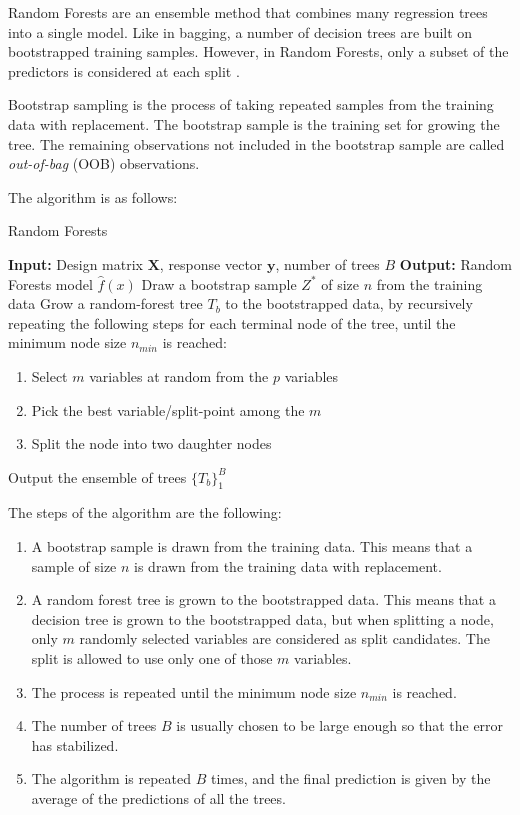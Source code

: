 \documentclass[12 pt]{scrartcl}
\numberwithin{equation}{section}
\begin{document}
Random Forests are an ensemble method that combines many regression trees into a single model.
Like in bagging, a number of decision trees are built on bootstrapped training samples.
However, in Random Forests, only a subset of the predictors is considered at each split
\citep[p.385-386]{stat-learning}.

Bootstrap sampling is the process of taking repeated samples from the training data with replacement.
The bootstrap sample is the training set for growing the tree.
The remaining observations not included in the bootstrap sample are called \textit{out-of-bag} (OOB) observations.

The algorithm is as follows:

\begin{algorithm}[H]
    \caption{Random Forests}\label{alg:cap}
    \begin{algorithmic}
    \State \textbf{Input:} Design matrix $\mathbf{X}$, response vector $\mathbf{y}$, number of trees $B$
    \State \textbf{Output:} Random Forests model $\hat{f}(x)$
    \State Draw a bootstrap sample $Z^{*}$ of size $n$ from the training data
    \State Grow a random-forest tree $T_{b}$ to the bootstrapped data, by recursively repeating the following steps for each terminal node of the tree, until the minimum node size $n_{min}$ is reached:
    \begin{enumerate}
        \item Select $m$ variables at random from the $p$ variables
        \item Pick the best variable/split-point among the $m$
        \item Split the node into two daughter nodes
    \end{enumerate}
    \EndFor
    \State Output the ensemble of trees $\{T_{b}\}_{1}^{B}$
    \end{algorithmic}
    \end{algorithm}

The steps of the algorithm are the following:

\begin{enumerate}
    \item A bootstrap sample is drawn from the training data. This means that a sample of size $n$ is drawn from the training data with replacement.
    \item A random forest tree is grown to the bootstrapped data. This means that a decision tree is grown to the bootstrapped data, but when splitting a node, only $m$ randomly selected variables are considered as split candidates. The split is allowed to use only one of those $m$ variables.
    \item The process is repeated until the minimum node size $n_{min}$ is reached.
    \item The number of trees $B$ is usually chosen to be large enough so that the error has stabilized.
    \item The algorithm is repeated $B$ times, and the final prediction is given by the average of the predictions of all the trees.
\end{enumerate}
\end{document}
